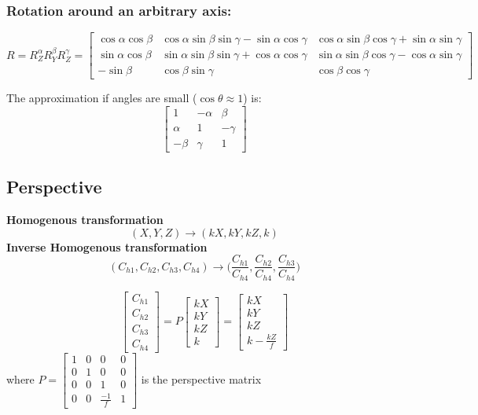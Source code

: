 \documentclass{article}
\begin{document}
\subsubsection*{Rotation around an arbitrary axis:}
\[R=R_Z^\alpha R_Y^\beta R_Z^\gamma=\begin{bmatrix}
    \cos\alpha\cos\beta & \cos\alpha\sin\beta\sin\gamma - \sin\alpha\cos\gamma & \cos\alpha\sin\beta\cos\gamma + \sin\alpha\sin\gamma \\
    \sin\alpha\cos\beta & \sin\alpha\sin\beta\sin\gamma + \cos\alpha\cos\gamma & \sin\alpha\sin\beta\cos\gamma - \cos\alpha\sin\gamma \\
    -\sin\beta & \cos\beta\sin\gamma & \cos\beta\cos\gamma
\end{bmatrix}\]

The approximation if angles are small ($\cos\theta \approx 1$) is:
\[\begin{bmatrix}
    1 & -\alpha & \beta \\
    \alpha & 1 & -\gamma \\
    -\beta & \gamma & 1
\end{bmatrix}\]

\subsection*{Perspective}
\textbf{Homogenous transformation}
\[(X, Y, Z) \rightarrow (kX, kY, kZ, k)\]
\textbf{Inverse Homogenous transformation}
\[(C_{h1}, C_{h2}, C_{h3}, C_{h4}) \rightarrow \Big(\frac{C_{h1}}{C_{h4}}, \frac{C_{h2}}{C_{h4}}, \frac{C_{h3}}{C_{h4}}\Big)\]

\[\begin{bmatrix}
    C_{h1} \\ C_{h2} \\ C_{h3} \\ C_{h4}
\end{bmatrix} = P \begin{bmatrix}
    kX \\ kY \\ kZ \\ k
\end{bmatrix}=\begin{bmatrix}
    kX \\ kY \\ kZ \\ k - \frac{kZ}{f}
\end{bmatrix}\] where $P=\begin{bmatrix}
    1 & 0 & 0 & 0 \\
    0 & 1 & 0 & 0 \\
    0 & 0 & 1 & 0 \\
    0 & 0 & \frac{-1}{f} & 1
\end{bmatrix}$ is the perspective matrix
\end{document}
